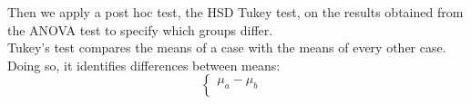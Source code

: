 Then we apply a post hoc test, the HSD Tukey test, on the results obtained from the ANOVA test to specify which groups differ. \\

Tukey's test compares the means of a case with the means of every other case. Doing so, it identifies differences between means:\\

$$\begin{cases}
\mu_a-\mu_b &\\
\end{cases}$$\\

